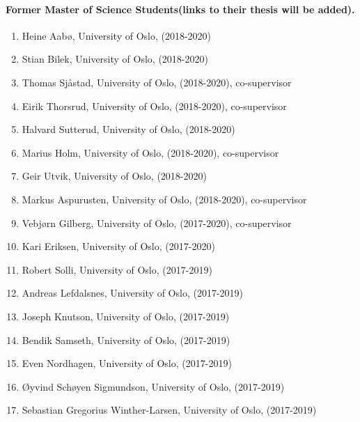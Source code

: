\documentclass[%
oneside,                 %
final,                   %
10pt]{article}
\begin{document}
\noindent
\paragraph{Former Master of Science Students(links to their thesis will be added).}
\begin{enumerate}
\item Heine Aabø, University of Oslo, (2018-2020)

\item Stian Bilek, University of Oslo, (2018-2020)

\item Thomas Sjåstad, University of Oslo, (2018-2020), co-supervisor

\item Eirik Thorsrud, University of Oslo, (2018-2020), co-supervisor

\item Halvard Sutterud, University of Oslo, (2018-2020)

\item Marius Holm, University of Oslo, (2018-2020), co-supervisor

\item Geir Utvik, University of Oslo, (2018-2020)

\item Markus Aspurusten, University of Oslo, (2018-2020), co-supervisor

\item Vebjørn Gilberg, University of Oslo, (2017-2020), co-supervisor

\item Kari Eriksen, University of Oslo, (2017-2020)

\item Robert Solli, University of Oslo, (2017-2019)

\item Andreas Lefdalsnes, University of Oslo, (2017-2019)

\item Joseph Knutson, University of Oslo, (2017-2019)

\item Bendik Samseth, University of Oslo, (2017-2019)

\item Even Nordhagen, University of Oslo, (2017-2019)

\item Øyvind Schøyen Sigmundson, University of Oslo, (2017-2019)

\item Sebastian Gregorius Winther-Larsen, University of Oslo, (2017-2019)


\end{enumerate}
\end{document}
